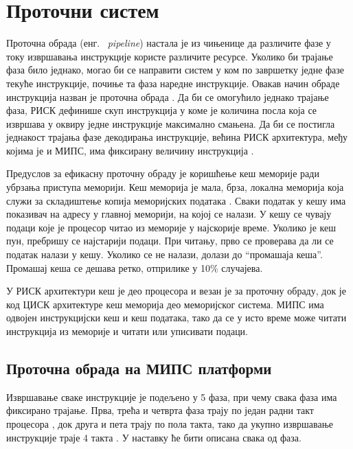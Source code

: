 \documentclass[12pt,oneside]{memoir}
\begin{document}
\section{Проточни систем }
\label{sec:pipeline}
Проточна обрада (енг. ~\textit{pipeline}) настала је из чињенице да различите фазе у току извршавања инструкције користе различите ресурсе. Уколико би трајање фаза било једнако, могао би се направити систем у ком по завршетку једне фазе текуће инструкције, почиње та фаза наредне инструкције. Овакав начин обраде инструкција назван је проточна обрада \cite{pipeline}. Да би се омогућило једнако трајање фаза, РИСК дефинише скуп инструкција у коме је количина посла која се извршава у оквиру једне инструкције максимално смањена. Да би се постигла једнакост трајања фазе декодирања инструкције, већина РИСК архитектура, међу којима је и МИПС, има фиксирану величину инструкција \cite{mips}.

Предуслов за ефикасну проточну обраду је коришћење кеш меморије ради убрзања приступа меморији. Кеш меморија је мала, брза, локална меморија која служи за складиштење копија меморијских података \cite{mips}. Сваки податак у кешу има показивач на адресу у главној меморији, на којој се налази. У кешу се чувају подаци које је процесор читао из меморије у најскорије време. Уколико је кеш пун, пребришу се најстарији подаци. При читању, прво се проверава да ли се податак налази у кешу. Уколико се не налази, долази до “промашаја кеша”. Промашај кеша се дешава ретко, отприлике у 10\% случајева.

У РИСК архитектури кеш је део процесора и везан је за проточну обраду, док је код ЦИСК архитектуре кеш меморија део меморијског система. МИПС има одвојен инструкцијски кеш и кеш података, тако да се у исто време може читати инструкција из меморије и читати или уписивати подаци. 

\subsection{Проточна обрада на МИПС платформи}

Извршавање сваке инструкције је подељено у 5 фаза, при чему свака фаза има фиксирано трајање. Прва, трећа и четврта фаза трају по један радни такт процесора , док друга и пета трају по пола такта, тако да укупно извршавање инструкције траје 4 такта \cite{mips}. У наставку ће бити описана свака од фаза.
\end{document}
